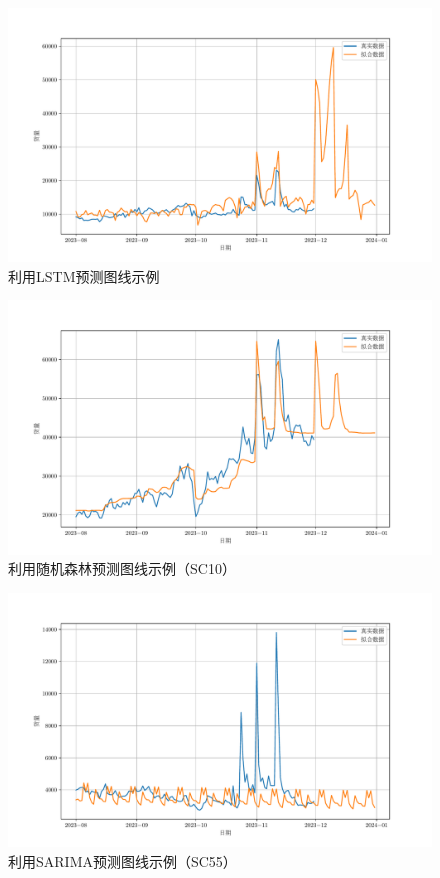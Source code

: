 \documentclass[UTF8,a4paper,10 pt]{article}%
\begin{document}
\begin{figure}[t]
	\centering
	\includegraphics*[width=0.8\linewidth]{images/LSTM_R.pdf}
	\caption{利用LSTM预测图线示例}
	\label{lstm}
\end{figure}
\begin{figure}[!ht]
	\centering
	\includegraphics*[width=0.8\linewidth]{images/pre_10.pdf}
	\caption{利用随机森林预测图线示例（SC10）}
	\label{rf}
\end{figure}

\begin{figure}[!ht]
	\centering
	\includegraphics*[width=0.8\linewidth]{images/pre_55.pdf}
	\caption{利用SARIMA预测图线示例（SC55）}
	\label{sarima}
\end{figure}
\end{document}
